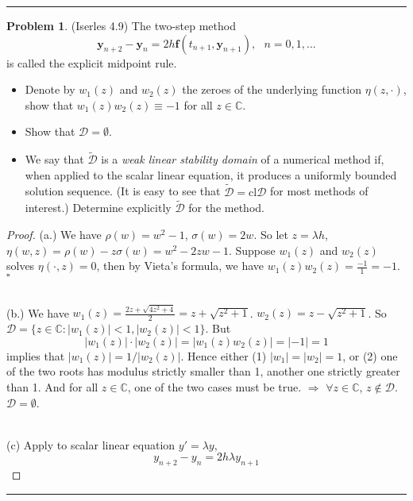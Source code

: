 \documentclass[a4paper, 10pt]{article}
\theoremstyle{definition}
\newtheorem{problem}{Problem}
\theoremstyle{hSol}
\begin{document}
\noindent\rule{16cm}{0.4pt}

\begin{problem} (Iserles 4.9) The two-step method 
$$
\bm{y}_{n+2} - \bm{y}_n = 2h \bm{f}(t_{n+1}, \bm{y}_{n+1}),~~~n=0,1,... 
$$ 
is called the explicit midpoint rule.
\begin{itemize}
  \item[a.] Denote by $w_1(z)$ and $w_2(z)$ the zeroes of the underlying function $\eta(z, \cdot)$, show that $w_1(z)w_2(z)\equiv -1$ for all $z\in \mathbb{C}$.
  \item[b.] Show that $\mathcal{D}=\emptyset$.
  \item[c.] We say that $\tilde{\mathcal{D}}$ is a \emph{weak linear stability domain} of a numerical method if, when applied to the scalar linear equation, it produces a uniformly bounded solution sequence. (It is easy to see that $\tilde{\mathcal{D}} = \text{cl}\mathcal{D}$ for most methods of interest.) Determine explicitly $\tilde{\mathcal{D}}$ for the method.
\end{itemize}
\end{problem}
\begin{proof} (a.) We have $\rho(w)=w^2-1$, $\sigma(w)=2w$. So let $z=\lambda h$, $\eta(w, z)=\rho(w)-z\sigma(w)=w^2-2zw-1$. Suppose $w_1(z)$ and $w_2(z)$ solves $\eta(\cdot, z)=0$, then by Vieta's formula, we have $w_1(z)w_2(z)=\frac{-1}{1}=-1$. $\square$

~\\
(b.) We have $w_1(z)=\frac{2z+\sqrt{4z^2+4}}{2}=z+\sqrt{z^2+1}$. $w_2(z)=z-\sqrt{z^2+1}$. So $\mathcal{D}=\{z\in \mathbb{C}: |w_1(z)|<1, |w_2(z)|<1\}$. But
$$
|w_1(z)|\cdot|w_2(z)| = |w_1(z)w_2(z)| = |-1| = 1
$$
implies that $|w_1(z)| = 1/|w_2(z)|$. Hence either (1) $|w_1|=|w_2|=1$, or (2) one of the two roots has modulus strictly smaller than 1, another one strictly greater than 1. And for all $z\in \mathbb{C}$, one of the two cases must be true. $\Rightarrow$ $\forall z \in \mathbb{C}$, $z\notin \mathcal{D}$. $\mathcal{D}= \emptyset$.

~\\
(c) Apply to scalar linear equation $y'=\lambda y$,
$$
y_{n+2} - y_n = 2h \lambda y_{n+1}
$$
\end{proof} 
\noindent\rule{16cm}{0.4pt}
\end{document}
